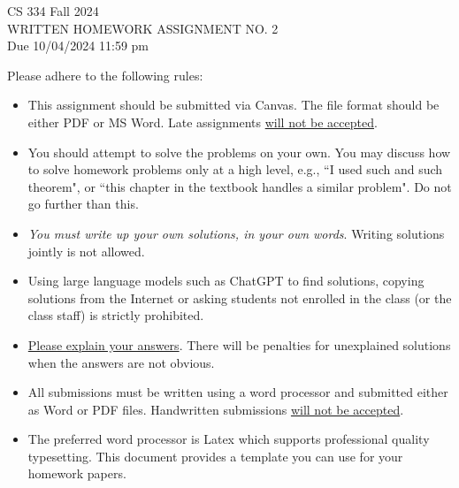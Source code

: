 \documentclass[ x11names, dvipsnames, usenames]{article}
\begin{document}
\begin{center}   

\begin{framed}  
CS 334 Fall 2024\\[2mm]  WRITTEN HOMEWORK ASSIGNMENT  NO. 2\\[2mm]
Due 10/04/2024 11:59 pm
\end{framed}

\end{center}




\vspace{5mm} 
Please adhere to the following rules:

\begin{itemize} 
\item This assignment should be submitted via Canvas. The file format should be either PDF or MS Word. Late assignments {\underline{will not be accepted}}.

    \item You should attempt to solve the problems
      on your own. You may discuss how to solve homework problems only at a high level, e.g., ``I used such and such theorem", or ``this chapter in the textbook handles a similar problem". Do not go further than this.
      
     \item  {\em You must write up your own solutions, in your own words}. Writing solutions jointly is not allowed.

\item Using large language models such as ChatGPT to find solutions, copying solutions from the Internet or asking
 students not enrolled in the class (or the class staff) is strictly prohibited. 

\item \underline{Please explain your answers}. There will be penalties for unexplained solutions when the answers are not obvious.

\item All submissions must be written using a word processor and submitted either as Word or PDF files. Handwritten submissions \underline{will not be accepted}.


\item The preferred word processor is Latex which supports professional quality typesetting. This document provides a template you can use for your homework papers.

\end{itemize}
\end{document}
